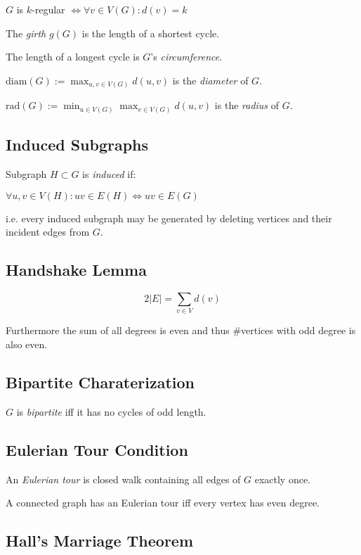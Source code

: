 \spacing

$G$ is $k$-regular $\iff \forall v \in V(G) : d(v) = k$

The \emph{girth} $g(G)$ is the length of a shortest cycle.

The length of a longest cycle is $G$'s \emph{circumference}.

\spacing

$\text{diam}(G) := \displaystyle\max_{u,v \in V(G)} d(u,v)$ is the \emph{diameter} of $G$.

\spacing

$\text{rad}(G) := \displaystyle\min_{u \in V(G)} \max_{v \in V(G)} d(u,v)$ is the \emph{radius} of $G$.

\subsection*{Induced Subgraphs}

Subgraph $H \subset G$ is \emph{induced} if:

$\forall u, v \in V(H) : uv \in E(H) \iff uv \in E(G)$

i.e. every induced subgraph may be generated by deleting vertices and their incident edges from $G$.

\subsection*{Handshake Lemma}

$$2|E| = \sum_{v \in V} d(v)$$

Furthermore the sum of all degrees is even and thus \#vertices with odd degree is also even.

\subsection*{Bipartite Charaterization}

$G$ is \emph{bipartite} iff it has no cycles of odd length.

\subsection*{Eulerian Tour Condition}

An \emph{Eulerian tour} is closed walk containing all edges of $G$ exactly once.

\spacing

A connected graph has an Eulerian tour iff every vertex has even degree.

\subsection*{Hall's Marriage Theorem}

